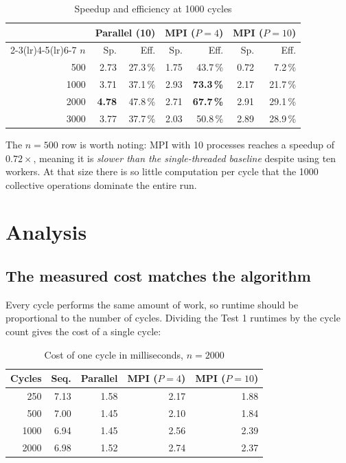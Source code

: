 \documentclass[sigconf]{acmart}
\begin{document}
\begin{table}[h]
\centering
\caption{Speedup and efficiency at 1000 cycles}
\begin{tabular}{@{}rrrrrrr@{}}
\toprule
 & \multicolumn{2}{c}{Parallel (10)} & \multicolumn{2}{c}{MPI ($P{=}4$)} & \multicolumn{2}{c}{MPI ($P{=}10$)} \\
\cmidrule(lr){2-3}\cmidrule(lr){4-5}\cmidrule(lr){6-7}
$n$ & Sp. & Eff. & Sp. & Eff. & Sp. & Eff. \\
\midrule
500  & 2.73 & 27.3\,\% & 1.75 & 43.7\,\%          & 0.72 & 7.2\,\% \\
1000 & 3.71 & 37.1\,\% & 2.93 & \textbf{73.3\,\%} & 2.17 & 21.7\,\% \\
2000 & \textbf{4.78} & 47.8\,\% & 2.71 & \textbf{67.7\,\%} & 2.91 & 29.1\,\% \\
3000 & 3.77 & 37.7\,\% & 2.03 & 50.8\,\%          & 2.89 & 28.9\,\% \\
\bottomrule
\end{tabular}
\end{table}

The $n = 500$ row is worth noting: MPI with 10 processes reaches a speedup of $0.72\times$, meaning
it is \emph{slower than the single-threaded baseline} despite using ten workers. At that size there
is so little computation per cycle that the 1000 collective operations dominate the entire run.

\section{Analysis}

\subsection{The measured cost matches the algorithm}

Every cycle performs the same amount of work, so runtime should be proportional to the number of
cycles. Dividing the Test 1 runtimes by the cycle count gives the cost of a single cycle:

\begin{table}[h]
\centering
\caption{Cost of one cycle in milliseconds, $n = 2000$}
\begin{tabular}{@{}rrrrr@{}}
\toprule
Cycles & Seq. & Parallel & MPI ($P{=}4$) & MPI ($P{=}10$) \\
\midrule
250  & 7.13 & 1.58 & 2.17 & 1.88 \\
500  & 7.00 & 1.45 & 2.10 & 1.84 \\
1000 & 6.94 & 1.45 & 2.56 & 2.39 \\
2000 & 6.98 & 1.52 & 2.74 & 2.37 \\
\bottomrule
\end{tabular}
\end{table}
\end{document}
